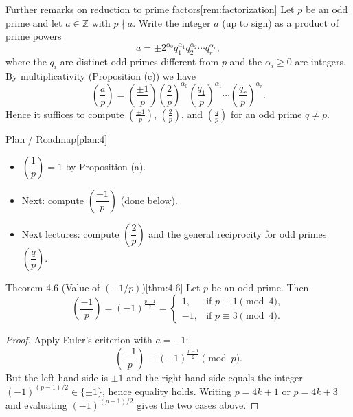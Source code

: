 \documentclass[10pt]{article}
\theoremstyle{definition}
\theoremstyle{plain}
\numberwithin{equation}{section}
\begin{document}
\begin{define}{Further remarks on reduction to prime factors}[rem:factorization]
Let $p$ be an odd prime and let $a\in\mathbb{Z}$ with $p\nmid a$. Write the integer $a$ (up to sign) as a product of prime powers
\[
a=\pm 2^{\alpha_0} q_1^{\alpha_1} q_2^{\alpha_2}\cdots q_r^{\alpha_r},
\]
where the $q_i$ are distinct odd primes different from $p$ and the $\alpha_i\ge 0$ are integers. By multiplicativity (Proposition (c)) we have
\[
\left(\frac{a}{p}\right)=\left(\frac{\pm1}{p}\right)\left(\frac{2}{p}\right)^{\alpha_0}
\left(\frac{q_1}{p}\right)^{\alpha_1}\cdots\left(\frac{q_r}{p}\right)^{\alpha_r}.
\]
Hence it suffices to compute $\left(\frac{\pm1}{p}\right)$, $\left(\frac{2}{p}\right)$, and $\left(\frac{q}{p}\right)$ for an odd prime $q\ne p$.
\end{define}

\begin{define}{Plan / Roadmap}[plan:4]
\begin{itemize}
  \item $\left(\dfrac{1}{p}\right)=1$ by Proposition (a).
  \item Next: compute $\left(\dfrac{-1}{p}\right)$ (done below).
  \item Next lectures: compute $\left(\dfrac{2}{p}\right)$ and the general reciprocity for odd primes $\left(\dfrac{q}{p}\right)$.
\end{itemize}
\end{define}

\bigskip

\begin{define}{Theorem 4.6 (Value of $(-1/p)$)}[thm:4.6]
Let $p$ be an odd prime. Then
\[
\left(\frac{-1}{p}\right)=(-1)^{\frac{p-1}{2}}=
\begin{cases}
1, & \text{if } p\equiv 1\pmod 4,\\[4pt]
-1,& \text{if } p\equiv 3\pmod 4.
\end{cases}
\]
\end{define}

\begin{proof}
Apply Euler's criterion with $a=-1$:
\[
\left(\frac{-1}{p}\right)\equiv (-1)^{\frac{p-1}{2}}\pmod p.
\]
But the left-hand side is $\pm1$ and the right-hand side equals the integer $(-1)^{(p-1)/2}\in\{\pm1\}$, hence equality holds. Writing $p=4k+1$ or $p=4k+3$ and evaluating $(-1)^{(p-1)/2}$ gives the two cases above.
\end{proof}
\end{document}
